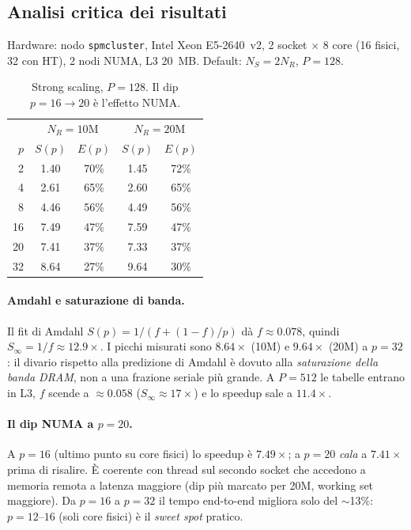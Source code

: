 \documentclass[11pt,a4paper]{article}
\theoremstyle{remark}
\begin{document}
\subsection{Analisi critica dei risultati}

Hardware: nodo \texttt{spmcluster}, Intel Xeon E5-2640~v2, 2 socket $\times$ 8 core (16 fisici, 32 con HT), 2 nodi NUMA, L3 20~MB. Default: $N_S=2N_R$, $P=128$.

\begin{table}[H]
\centering\small
\begin{tabular}{@{}rcccc@{}}
\toprule
 & \multicolumn{2}{c}{$N_R=10$M} & \multicolumn{2}{c}{$N_R=20$M} \\
$p$ & $S(p)$ & $E(p)$ & $S(p)$ & $E(p)$ \\
\midrule
2  & 1.40 & 70\% & 1.45 & 72\% \\
4  & 2.61 & 65\% & 2.60 & 65\% \\
8  & 4.46 & 56\% & 4.49 & 56\% \\
16 & 7.49 & 47\% & 7.59 & 47\% \\
20 & 7.41 & 37\% & 7.33 & 37\% \\
32 & 8.64 & 27\% & 9.64 & 30\% \\
\bottomrule
\end{tabular}
\caption{Strong scaling, $P=128$. Il dip $p{=}16\to20$ \`e l'effetto NUMA.}
\label{tab:m2strong}
\end{table}

\paragraph{Amdahl e saturazione di banda.} Il fit di Amdahl $S(p)=1/(f+(1-f)/p)$ d\`a $f\approx 0.078$, quindi $S_\infty=1/f\approx 12.9\times$. I picchi misurati sono $8.64\times$ (10M) e $9.64\times$ (20M) a $p=32$: il divario rispetto alla predizione di Amdahl \`e dovuto alla \emph{saturazione della banda DRAM}, non a una frazione seriale pi\`u grande. A $P=512$ le tabelle entrano in L3, $f$ scende a $\approx 0.058$ ($S_\infty\approx 17\times$) e lo speedup sale a $11.4\times$.

\paragraph{Il dip NUMA a $p=20$.} A $p=16$ (ultimo punto su core fisici) lo speedup \`e $7.49\times$; a $p=20$ \emph{cala} a $7.41\times$ prima di risalire. \`E coerente con thread sul secondo socket che accedono a memoria remota a latenza maggiore (dip pi\`u marcato per 20M, working set maggiore). Da $p=16$ a $p=32$ il tempo end-to-end migliora solo del $\sim$13\%: $p=12$--$16$ (soli core fisici) \`e il \emph{sweet spot} pratico.
\end{document}
